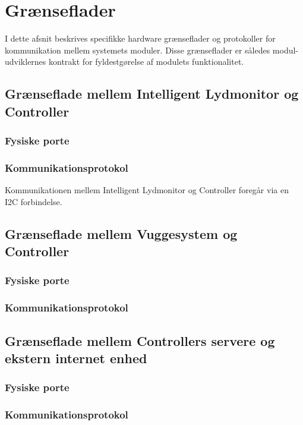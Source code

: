 
\section{Grænseflader}
I dette afsnit beskrives specifikke hardware grænseflader og protokoller for kommunikation mellem systemets moduler. Disse grænseflader er således modul-udviklernes kontrakt for fyldestgørelse af modulets funktionalitet.

\subsection{Grænseflade mellem Intelligent Lydmonitor og Controller}
\subsubsection*{Fysiske porte}


\subsubsection*{Kommunikationsprotokol}
Kommunikationen mellem Intelligent Lydmonitor og Controller foregår via en I2C forbindelse.

\subsection{Grænseflade mellem Vuggesystem og Controller}
\subsubsection*{Fysiske porte}

\subsubsection*{Kommunikationsprotokol}

\subsection{Grænseflade mellem Controllers servere og ekstern internet enhed}
\subsubsection*{Fysiske porte}

\subsubsection*{Kommunikationsprotokol}